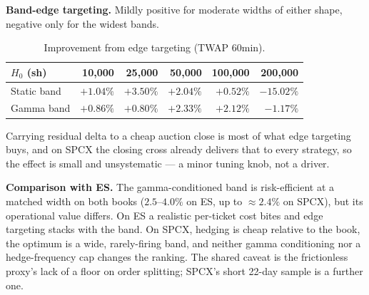 \documentclass{article}
\begin{document}
\textbf{Band-edge targeting.} Mildly positive for moderate widths of either shape, negative
only for the widest bands.

\begin{table}[htbp]
\centering
\small
\begin{tabular}{lrrrrr}
\toprule
$H_0$ (sh) & 10{,}000 & 25{,}000 & 50{,}000 & 100{,}000 & 200{,}000 \\
\midrule
Static band & $+1.04\%$ & $+3.50\%$ & $+2.04\%$ & $+0.52\%$ & $-15.02\%$ \\
Gamma band  & $+0.86\%$ & $+0.80\%$ & $+2.33\%$ & $+2.12\%$ & $-1.17\%$ \\
\bottomrule
\end{tabular}
\caption{Improvement from edge targeting (TWAP 60min).}
\end{table}

Carrying residual delta to a cheap auction close is most of what edge targeting buys, and on
SPCX the closing cross already delivers that to every strategy, so the effect is small and
unsystematic --- a minor tuning knob, not a driver.

\textbf{Comparison with ES.} The gamma-conditioned band is risk-efficient at a matched width
on both books ($2.5$--$4.0\%$ on ES, up to $\approx2.4\%$ on SPCX), but its operational value
differs. On ES a realistic per-ticket cost bites and edge targeting stacks with the band. On
SPCX, hedging is cheap relative to the book, the optimum is a wide, rarely-firing band, and
neither gamma conditioning nor a hedge-frequency cap changes the ranking. The shared caveat is
the frictionless proxy's lack of a floor on order splitting; SPCX's short 22-day sample is a
further one.
\end{document}
